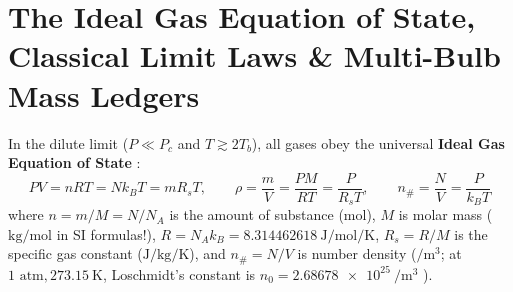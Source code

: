 \section{The Ideal Gas Equation of State, Classical Limit Laws \& Multi-Bulb Mass Ledgers}\label{sec:06.2}

In the dilute limit ($P \ll P_c$ and $T \gtrsim 2T_b$), all gases obey the universal \textbf{Ideal Gas Equation of State} :
\begin{equation}\label{eq:06:ideal-gas}
  PV = nRT = N k_B T = m R_s T, \qquad \rho = \frac{m}{V} = \frac{PM}{RT} = \frac{P}{R_s T}, \qquad n_{\#}=\frac{N}{V}=\frac{P}{k_B T}
\end{equation}
where $n = m/M = N/N_A$ is the amount of substance ($\si{\mole}$), $M$ is molar mass ($\si{\kilogram\per\mole}$ in SI formulas!), $R = N_A k_B = \SI{8.314462618}{\joule\per\mole\per\kelvin}$, $R_s = R/M$ is the specific gas constant ($\si{\joule\per\kilogram\per\kelvin}$), and $n_{\#} = N/V$ is number density ($\si{\per\cubic\meter}$; at $1\text{ atm}, \SI{273.15}{\kelvin}$, Loschmidt's constant is $n_0 = \SI{2.68678e25}{\per\cubic\meter}$ ).


